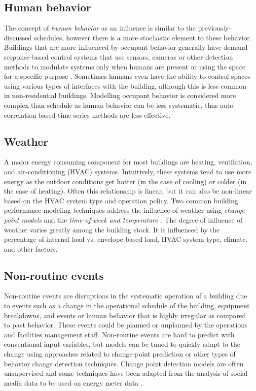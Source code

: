 \documentclass[preprint,12pt]{elsarticle}
\begin{document}
\subsection{Human behavior}
\label{sec:human}
The concept of \emph{human behavior} as an influence is similar to the previously-discussed schedules, however there is a more stochastic element to these behavior. Buildings that are more influenced by occupant behavior generally have demand response-based control systems that use sensors, cameras or other detection methods to modulate systems only when humans are present or using the space for a specific purpose \cite{Hong2018OccupantPrograms}. Sometimes humans even have the ability to control spaces using various types of interfaces with the building, although this is less common in non-residential buildings. Modelling occupant behavior is considered more complex than schedule as human behavior can be less systematic, thus auto correlation-based time-series methods are less effective. 

\subsection{Weather}
\label{sec:weather}
A major energy consuming component for most buildings are heating, ventilation, and air-conditioning (HVAC) systems. Intuitively, these systems tend to use more energy as the outdoor conditions get hotter (in the case of cooling) or colder (in the case of heating). Often this relationship is linear, but it can also be non-linear based on the HVAC system type and operation policy. Two common building performance modeling techniques address the influence of weather using \emph{change point models} \cite{KellyKissock2008MeasuringSavings} and the \emph{time-of-week and temperature} \cite{Mathieu2011QuantifyingResponse}. The degree of influence of weather varies greatly among the building stock. It is influenced by the percentage of internal load vs. envelope-based load, HVAC system type, climate, and other factors. 

\subsection{Non-routine events}
\label{sec:nre}
Non-routine events are disruptions in the systematic operation of a building due to events such as a change in the operational schedule of the building, equipment breakdowns, and events or human behavior that is highly irregular as compared to past behavior. These events could be planned or unplanned by the operations and facilities management staff. Non-routine events are hard to predict with conventional input variables, but models can be tuned to quickly adapt to the change using approaches related to change-point prediction or other types of behavior change detection techniques. Change point detection models are often unsupervised and some techniques have been adapted from the analysis of social media data to be used on energy meter data \cite{Miller2017MiningBuildings, James2016LeveragingBad}.
\end{document}
